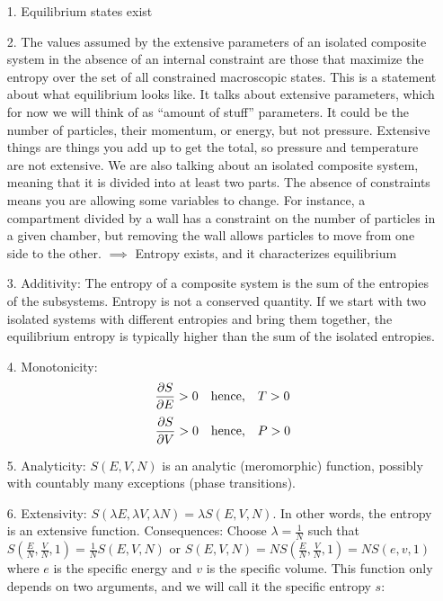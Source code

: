 \documentclass[a4paper,twoside,master.tex]{subfiles}
\begin{document}
\begin{itemize}
    \item[1.] Equilibrium states exist
    \item[2.] The values assumed by the extensive parameters of an isolated composite system in the absence of an internal constraint are those that maximize the entropy over the set of all constrained macroscopic states.
        \subitem This is a statement about what equilibrium looks like. It talks about extensive parameters, which for now we will think of as ``amount of stuff'' parameters. It could be the number of particles, their momentum, or energy, but not pressure. Extensive things are things you add up to get the total, so pressure and temperature are not extensive. We are also talking about an isolated composite system, meaning that it is divided into at least two parts. The absence of constraints means you are allowing some variables to change. For instance, a compartment divided by a wall has a constraint on the number of particles in a given chamber, but removing the wall allows particles to move from one side to the other.
        \subitem $ \implies $ Entropy exists, and it characterizes equilibrium
    \item[3.] Additivity: The entropy of a composite system is the sum of the entropies of the subsystems.
        \subitem Entropy is not a conserved quantity. If we start with two isolated systems with different entropies and bring them together, the equilibrium entropy is typically higher than the sum of the isolated entropies.
    \item[4.] Monotonicity:
        \begin{equation}
            \pdv{S}{E} > 0 \qq{hence,} T > 0
        \end{equation}
        \begin{equation}
            \pdv{S}{V} > 0 \qq{hence,} P > 0
        \end{equation}
    \item[5.] Analyticity: $ S(E,V,N) $ is an analytic (meromorphic) function, possibly with countably many exceptions (phase transitions).
    \item[6.] Extensivity: $ S(\lambda E, \lambda V, \lambda N) = \lambda S(E, V, N) $. In other words, the entropy is an extensive function.
        \subitem Consequences: Choose $ \lambda = \frac{1}{N} $ such that $ S\left( \frac{E}{N}, \frac{V}{N}, 1 \right) = \frac{1}{N} S(E, V, N) $ or $ S(E,V,N) = N S\left( \frac{E}{N}, \frac{V}{N}, 1 \right) = NS(e, v, 1) $ where $ e $ is the specific energy and $ v $ is the specific volume. This function only depends on two arguments, and we will call it the specific entropy $ s $:

\end{itemize}
\end{document}
